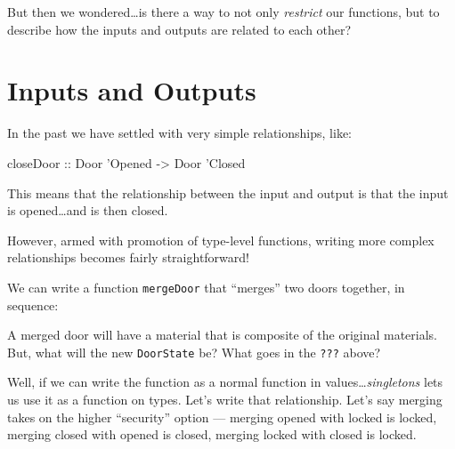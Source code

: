 \documentclass[]{article}
\newenvironment{Shaded}{}{}
\newcommand{\DataTypeTok}[1]{\textcolor[rgb]{0.56,0.13,0.00}{#1}}
\newcommand{\FunctionTok}[1]{\textcolor[rgb]{0.02,0.16,0.49}{#1}}
\newcommand{\NormalTok}[1]{#1}
\newcommand{\OtherTok}[1]{\textcolor[rgb]{0.00,0.44,0.13}{#1}}
\newcommand{\StringTok}[1]{\textcolor[rgb]{0.25,0.44,0.63}{#1}}
\begin{document}
But then we wondered\ldots{}is there a way to not only \emph{restrict} our
functions, but to describe how the inputs and outputs are related to each other?

\hypertarget{inputs-and-outputs}{%
\section{Inputs and Outputs}\label{inputs-and-outputs}}

In the past we have settled with very simple relationships, like:

\begin{Shaded}
\begin{Highlighting}[]
\OtherTok{closeDoor ::} \DataTypeTok{Door}\NormalTok{ '}\DataTypeTok{Opened} \OtherTok{->} \DataTypeTok{Door}\NormalTok{ '}\DataTypeTok{Closed}
\end{Highlighting}
\end{Shaded}

This means that the relationship between the input and output is that the input
is opened\ldots{}and is then closed.

However, armed with promotion of type-level functions, writing more complex
relationships becomes fairly straightforward!

We can write a function \texttt{mergeDoor} that ``merges'' two doors together,
in sequence:

\begin{Shaded}
\end{Shaded}

A merged door will have a material that is composite of the original materials.
But, what will the new \texttt{DoorState} be? What goes in the \texttt{???}
above?

Well, if we can write the function as a normal function in
values\ldots{}\emph{singletons} lets us use it as a function on types. Let's
write that relationship. Let's say merging takes on the higher ``security''
option --- merging opened with locked is locked, merging closed with opened is
closed, merging locked with closed is locked.
\end{document}
